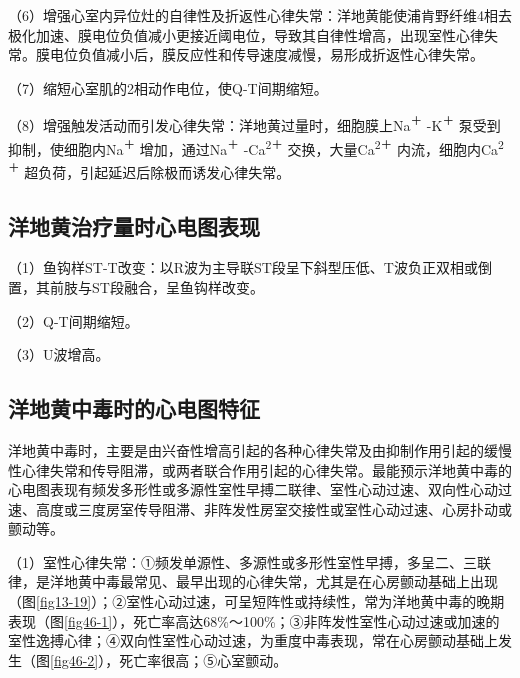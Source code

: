（6）增强心室内异位灶的自律性及折返性心律失常：洋地黄能使浦肯野纤维4相去极化加速、膜电位负值减小更接近阈电位，导致其自律性增高，出现室性心律失常。膜电位负值减小后，膜反应性和传导速度减慢，易形成折返性心律失常。

（7）缩短心室肌的2相动作电位，使Q-T间期缩短。

（8）增强触发活动而引发心律失常：洋地黄过量时，细胞膜上Na\textsuperscript{＋}
-K\textsuperscript{＋} 泵受到抑制，使细胞内Na\textsuperscript{＋}
增加，通过Na\textsuperscript{＋} -Ca\textsuperscript{2＋}
交换，大量Ca\textsuperscript{2＋} 内流，细胞内Ca\textsuperscript{2＋}
超负荷，引起延迟后除极而诱发心律失常。

\protect\hypertarget{text00054.htmlux5cux23subid647}{}{}

\subsection{洋地黄治疗量时心电图表现}

（1）鱼钩样ST-T改变：以R波为主导联ST段呈下斜型压低、T波负正双相或倒置，其前肢与ST段融合，呈鱼钩样改变。

（2）Q-T间期缩短。

（3）U波增高。

\protect\hypertarget{text00054.htmlux5cux23subid648}{}{}

\subsection{洋地黄中毒时的心电图特征}

洋地黄中毒时，主要是由兴奋性增高引起的各种心律失常及由抑制作用引起的缓慢性心律失常和传导阻滞，或两者联合作用引起的心律失常。最能预示洋地黄中毒的心电图表现有频发多形性或多源性室性早搏二联律、室性心动过速、双向性心动过速、高度或三度房室传导阻滞、非阵发性房室交接性或室性心动过速、心房扑动或颤动等。

（1）室性心律失常：①频发单源性、多源性或多形性室性早搏，多呈二、三联律，是洋地黄中毒最常见、最早出现的心律失常，尤其是在心房颤动基础上出现（图\ref{fig13-19}）；②室性心动过速，可呈短阵性或持续性，常为洋地黄中毒的晚期表现（图\ref{fig46-1}），死亡率高达68\%～100\%；③非阵发性室性心动过速或加速的室性逸搏心律；④双向性室性心动过速，为重度中毒表现，常在心房颤动基础上发生（图\ref{fig46-2}），死亡率很高；⑤心室颤动。


